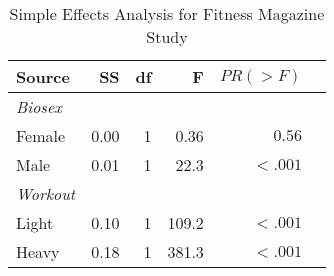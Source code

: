 \documentclass[onecolumn,10pt]{jhwhw}
\begin{document}
\begin{table}[htdp]
\begin{center}
\begin{tabular}{l r r r r r}
\toprule
Source & SS & df & F & $PR(>F)$ \\
\midrule
\it{Biosex} & & & & \\
\hspace{1em} Female     & 0.00 &  1  & 0.36 & $0.56$ \\
\hspace{1em} Male       & 0.01 &  1  & 22.3 & $<.001$\\
\it{Workout} & & & & \\
\hspace{1em} Light      & 0.10 &  1  & 109.2 & $<.001$\\
\hspace{1em} Heavy      & 0.18 &  1  & 381.3 & $<.001$\\
\bottomrule
\end{tabular}
\end{center}
\caption{Simple Effects Analysis for Fitness Magazine Study}
\end{table}





\end{document}
